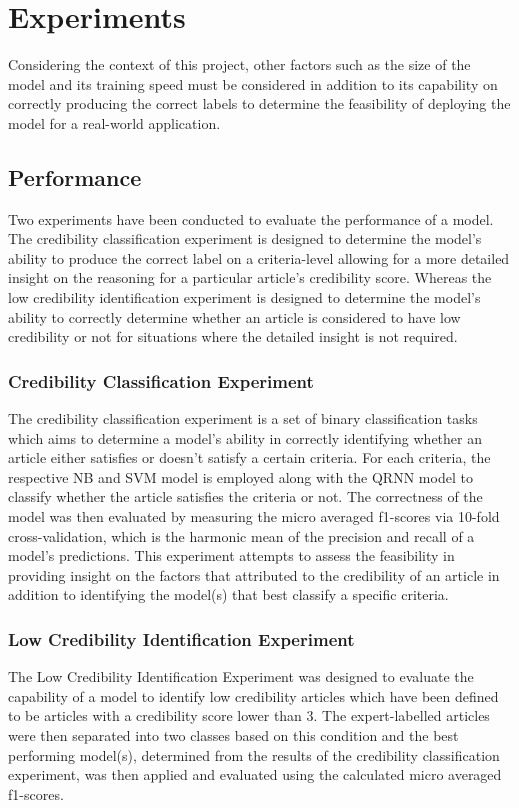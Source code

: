 \documentclass[a4paper,twoside,phd]{BYUPhys}
\begin{document}
\section{Experiments}
\label{sec:Experiments}

Considering the context of this project, other factors such as the size of the model and its training speed must be considered in addition to its capability on correctly producing the correct labels to determine the feasibility of deploying the model for a real-world application. 

\subsection{Performance}
\label{sec:PerformanceExperiments}

Two experiments have been conducted to evaluate the performance of a model. The credibility classification experiment is designed to determine the model's ability to produce the correct label on a criteria-level allowing for a more detailed insight on the reasoning for a particular article's credibility score. Whereas the low credibility identification experiment is designed to determine the model's ability to correctly determine whether an article is considered to have low credibility or not for situations where the detailed insight is not required.

\subsubsection{Credibility Classification Experiment}
\label{sec:CredibilityClassificationExperiment}
The credibility classification experiment is a set of binary classification tasks which aims to determine a model's ability in correctly identifying whether an article either satisfies or doesn't satisfy a certain criteria. 
For each criteria, the respective NB and SVM model is employed along with the QRNN model to classify whether the article satisfies the criteria or not. The correctness of the model was then evaluated by measuring the micro averaged f1-scores via 10-fold cross-validation, which is the harmonic mean of the precision and recall of a model's predictions. This experiment attempts to assess the feasibility in providing insight on the factors that attributed to the credibility of an article in addition to identifying the model(s) that best classify a specific criteria.


\subsubsection{Low Credibility Identification Experiment}
\label{sec:LowCredibilityIdentification}
The Low Credibility Identification Experiment was designed to evaluate the capability of a model to identify low credibility articles which have been defined to be articles with a credibility score lower than 3. The expert-labelled articles were then separated into two  classes based on this condition and the best performing model(s), determined from the results of the credibility classification experiment, was then applied and evaluated using the calculated micro averaged f1-scores. \newline
\end{document}
